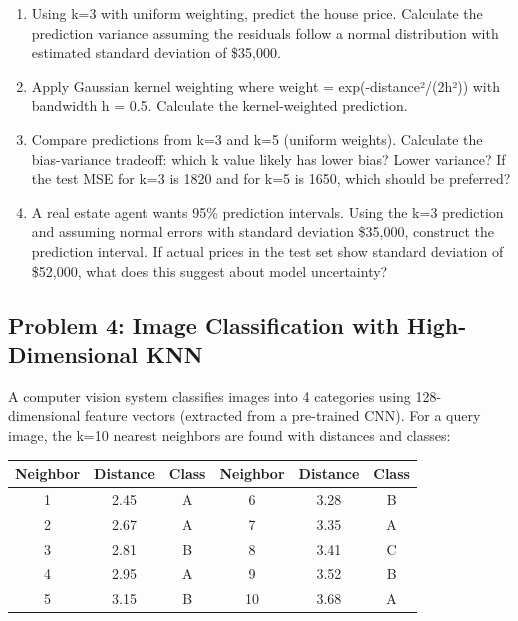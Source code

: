 \documentclass[12pt]{article}
\begin{document}
\begin{enumerate}[label=(\alph*)]
\item Using k=3 with uniform weighting, predict the house price. Calculate the prediction variance assuming the residuals follow a normal distribution with estimated standard deviation of \$35,000.

\item Apply Gaussian kernel weighting where weight = exp(-distance²/(2h²)) with bandwidth h = 0.5. Calculate the kernel-weighted prediction.

\item Compare predictions from k=3 and k=5 (uniform weights). Calculate the bias-variance tradeoff: which k value likely has lower bias? Lower variance? If the test MSE for k=3 is 1820 and for k=5 is 1650, which should be preferred?

\item A real estate agent wants 95\% prediction intervals. Using the k=3 prediction and assuming normal errors with standard deviation \$35,000, construct the prediction interval. If actual prices in the test set show standard deviation of \$52,000, what does this suggest about model uncertainty?
\end{enumerate}

\subsection*{Problem 4: Image Classification with High-Dimensional KNN}

A computer vision system classifies images into 4 categories using 128-dimensional feature vectors (extracted from a pre-trained CNN). For a query image, the k=10 nearest neighbors are found with distances and classes:

\begin{center}
\begin{tabular}{ccc|ccc}
\toprule
Neighbor & Distance & Class & Neighbor & Distance & Class \\
\midrule
1 & 2.45 & A & 6 & 3.28 & B \\
2 & 2.67 & A & 7 & 3.35 & A \\
3 & 2.81 & B & 8 & 3.41 & C \\
4 & 2.95 & A & 9 & 3.52 & B \\
5 & 3.15 & B & 10 & 3.68 & A \\
\bottomrule
\end{tabular}
\end{center}
\end{document}

